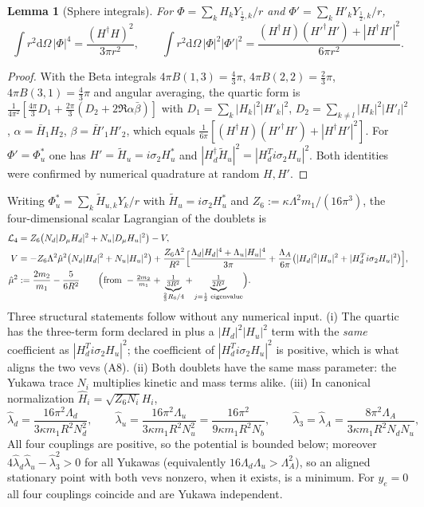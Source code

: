 \documentclass[11pt,letterpaper]{article}
\newtheorem{lemma}{Lemma}
\newcommand{\dd}{\mathrm d}
\newcommand{\Lam}{\Lambda}
\newcommand{\hmu}{\hat\mu}
\begin{document}
\begin{lemma}[Sphere integrals]\label{lem:sphere}
For $\Phi=\sum_kH_kY_{\frac12,k}/r$ and $\Phi'=\sum_kH'_kY_{\frac12,k}/r$,
\begin{equation}
\int r^2\dd\Omega\,|\Phi|^4=\frac{(H^\dagger H)^2}{3\pi r^2},\qquad
\int r^2\dd\Omega\,|\Phi|^2|\Phi'|^2=\frac{(H^\dagger H)(H'^\dagger H')+|H^\dagger H'|^2}{6\pi r^2}.
\end{equation}
\end{lemma}
\begin{proof}
With the Beta integrals $4\pi B(1,3)=\tfrac43\pi$, $4\pi B(2,2)=\tfrac23\pi$, $4\pi B(3,1)=\tfrac43\pi$ and angular averaging, the quartic form is $\tfrac1{4\pi^2}[\tfrac{4\pi}3D_1+\tfrac{2\pi}3(D_2+2\Re\alpha\bar\beta)]$ with $D_1=\sum_k|H_k|^2|H'_k|^2$, $D_2=\sum_{k\ne l}|H_k|^2|H'_l|^2$, $\alpha=\bar H_1H_2$, $\beta=\bar H'_1H'_2$, which equals $\tfrac1{6\pi}[(H^\dagger H)(H'^\dagger H')+|H^\dagger H'|^2]$. For $\Phi'=\Phi_u^{*}$ one has $H'=\tilde H_u=i\sigma_2H_u^{*}$ and $|H_d^\dagger\tilde H_u|^2=|H_d^{T}i\sigma_2H_u|^2$. Both identities were confirmed by numerical quadrature at random $H,H'$.
\end{proof}

Writing $\Phi_u^{*}=\sum_k\tilde H_{u,k}Y_k/r$ with $\tilde H_u=i\sigma_2H_u^{*}$ and $Z_6:=\kappa\Lam^2m_1/(16\pi^3)$, the four-dimensional scalar Lagrangian of the doublets is
\begin{align}
\mathcal L_4&=Z_6\bigl(N_d|D_\mu H_d|^2+N_u|D_\mu H_u|^2\bigr)-V,\nonumber\\
V&=-Z_6\Lam^2\hmu^2\bigl(N_d|H_d|^2+N_u|H_u|^2\bigr)+\frac{Z_6\Lam^2}{R^2}\Bigl[\frac{\Lam_d|H_d|^4+\Lam_u|H_u|^4}{3\pi}+\frac{\Lam_A}{6\pi}\bigl(|H_d|^2|H_u|^2+|H_d^{T}i\sigma_2H_u|^2\bigr)\Bigr],
\label{eq:V4}\\
\hmu^2&:=\frac{2m_2}{m_1}-\frac5{6R^2}\qquad\Bigl(\text{from }-\tfrac{2m_2}{m_1}+\underbrace{\tfrac1{3R^2}}_{\frac23R_6/4}+\underbrace{\tfrac1{2R^2}}_{j=\frac12\text{ eigenvalue}}\Bigr).
\end{align}
Three structural statements follow without any numerical input. (i) The quartic has the three-term form declared in \cite{neutral} plus a $|H_d|^2|H_u|^2$ term with the \emph{same} coefficient as $|H_d^{T}i\sigma_2H_u|^2$; the coefficient of $|H_d^{T}i\sigma_2H_u|^2$ is positive, which is what aligns the two vevs (A8). (ii) Both doublets have the same mass parameter: the Yukawa trace $N_i$ multiplies kinetic and mass terms alike. (iii) In canonical normalization $\hat H_i=\sqrt{Z_6N_i}H_i$,
\begin{equation}
\hat\lambda_d=\frac{16\pi^2\Lam_d}{3\kappa m_1R^2N_d^2},\qquad \hat\lambda_u=\frac{16\pi^2\Lam_u}{3\kappa m_1R^2N_u^2}=\frac{16\pi^2}{9\kappa m_1R^2N_b},\qquad \hat\lambda_3=\hat\lambda_A=\frac{8\pi^2\Lam_A}{3\kappa m_1R^2N_dN_u},
\end{equation}
All four couplings are positive, so the potential is bounded below; moreover $4\hat\lambda_d\hat\lambda_u-\hat\lambda_3^2>0$ for all Yukawas (equivalently $16\Lam_d\Lam_u>\Lam_A^2$), so an aligned stationary point with both vevs nonzero, when it exists, is a minimum. For $y_e=0$ all four couplings coincide and are Yukawa independent.
\end{document}
